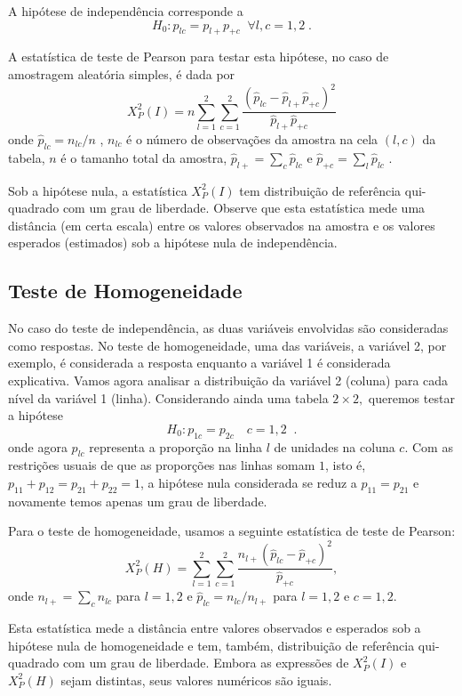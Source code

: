 \documentclass[]{book}
\numberwithin{example}{chapter}
\numberwithin{remark}{chapter}
\numberwithin{definition}{chapter}
\begin{document}
A hipótese de independência corresponde a \[
H_{0}:p_{lc}=p_{l+}p_{+c}\;\;\forall l,c=1,2\;. 
\]

A estatística de teste de Pearson para testar esta hipótese, no caso de
amostragem aleatória simples, é dada por \[
X_{P}^{2}\left( I\right) =n\sum\limits_{l=1}^{2}\sum\limits_{c=1}^{2}\frac{
\left( \hat{p}_{lc}-\hat{p}_{l+}\hat{p}_{+c}\right) ^{2}}{\hat{p}_{l+}\hat{p}
_{+c}} 
\] onde \(\hat{p}_{lc}=n_{lc}/n\) , \(n_{lc}\) é o número de observações
da amostra na cela \(\left( l,c\right)\) da tabela, \(n\) é o tamanho
total da amostra, \(\hat{p}_{l+}=\sum\nolimits_{c}\widehat{p}_{lc}\) e
\(\hat{p}_{+c}=\sum_{l}\hat{p}_{lc}\) .

Sob a hipótese nula, a estatística \(X_{P}^{2}\left( I\right)\) tem
distribuição de referência qui-quadrado com um grau de liberdade.
Observe que esta estatística mede uma distância (em certa escala) entre
os valores observados na amostra e os valores esperados (estimados) sob
a hipótese nula de independência.

\subsection{Teste de Homogeneidade}\label{teste-de-homogeneidade}

No caso do teste de independência, as duas variáveis envolvidas são
consideradas como respostas. No teste de homogeneidade, uma das
variáveis, a variável 2, por exemplo, é considerada a resposta enquanto
a variável 1 é considerada explicativa. Vamos agora analisar a
distribuição da variável 2 (coluna) para cada nível da variável 1
(linha). Considerando ainda uma tabela \(2\times 2,\) queremos testar a
hipótese \[
H_{0}:p_{1c}=p_{2c}\quad c=1,2\;\;. 
\] onde agora \(p_{lc}\) representa a proporção na linha \(l\) de
unidades na coluna \(c\). Com as restrições usuais de que as proporções
nas linhas somam \(1\), isto é, \(p_{11}+p_{12}=p_{21}+p_{22}=1\), a
hipótese nula considerada se reduz a \(p_{11}=p_{21}\) e novamente temos
apenas um grau de liberdade.

Para o teste de homogeneidade, usamos a seguinte estatística de teste de
Pearson: \[
X_{P}^{2}\left( H\right) =\sum\limits_{l=1}^{2}\sum\limits_{c=1}^{2}\frac{
n_{l+}\left( \widehat{p}_{lc}-\hat{p}_{+c}\right) ^{2}}{\hat{p}_{+c}},
\] onde \(n_{l+}=\sum\nolimits_{c}n_{lc}\) para \(l=1,2\) e
\(\widehat{p} _{lc}=n_{lc}/n_{l+}\) para \(l=1,2\) e \(c=1,2\).

Esta estatística mede a distância entre valores observados e esperados
sob a hipótese nula de homogeneidade e tem, também, distribuição de
referência qui-quadrado com um grau de liberdade. Embora as expressões
de \(X_{P}^{2}\left( I\right)\) e \(X_{P}^{2}\left( H\right)\) sejam
distintas, seus valores numéricos são iguais.
\end{document}

